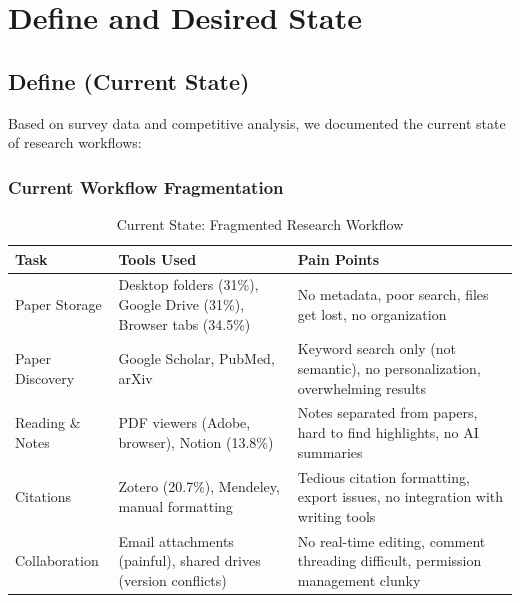 \section{Define and Desired State}

\subsection{Define (Current State)}

Based on survey data and competitive analysis, we documented the current state of research workflows:

\subsubsection{Current Workflow Fragmentation}

\begin{table}[H]
    \centering
    \small
    \begin{tabular}{|l|p{4cm}|p{6cm}|}
        \hline
        \textbf{Task}                                                      & \textbf{Tools Used} & \textbf{Pain Points} \\
        \hline
        Paper Storage                                                      &
        Desktop folders (31\%), Google Drive (31\%), Browser tabs (34.5\%) &
        No metadata, poor search, files get lost, no organization                                                       \\
        \hline
        Paper Discovery                                                    &
        Google Scholar, PubMed, arXiv                                      &
        Keyword search only (not semantic), no personalization, overwhelming results                                    \\
        \hline
        Reading \& Notes                                                   &
        PDF viewers (Adobe, browser), Notion (13.8\%)                      &
        Notes separated from papers, hard to find highlights, no AI summaries                                           \\
        \hline
        Citations                                                          &
        Zotero (20.7\%), Mendeley, manual formatting                       &
        Tedious citation formatting, export issues, no integration with writing tools                                   \\
        \hline
        Collaboration                                                      &
        Email attachments (painful), shared drives (version conflicts)     &
        No real-time editing, comment threading difficult, permission management clunky                                 \\
        \hline
    \end{tabular}
    \caption{Current State: Fragmented Research Workflow}
    \label{table:current-state}
\end{table}

